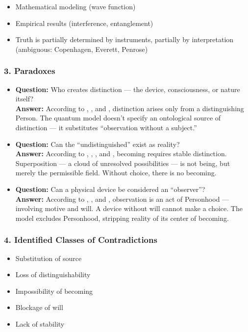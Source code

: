 \documentclass[12pt]{article}
\begin{document}
\begin{itemize}
\item Mathematical modeling (wave function)
\item Empirical results (interference, entanglement)
\item Truth is partially determined by instruments, partially by interpretation (ambiguous: Copenhagen, Everett, Penrose)
\end{itemize}

\subsubsection*{3. Paradoxes}

\begin{itemize}
\item \textbf{Question:} Who creates distinction — the device, consciousness, or nature itself?  
\\ \textbf{Answer:} According to \text{[9.1]}, \text{[11.1.1]}, and \text{[12]}, distinction arises only from a distinguishing Person. The quantum model doesn’t specify an ontological source of distinction — it substitutes ``observation without a subject.''

\item \textbf{Question:} Can the ``undistinguished'' exist as reality?  
\\ \textbf{Answer:} According to \text{[3]}, \text{[5]}, \text{[7]}, and \text{[4.4]}, becoming requires stable distinction. Superposition — a cloud of unresolved possibilities — is not being, but merely the permissible field. Without choice, there is no becoming.

\item \textbf{Question:} Can a physical device be considered an ``observer''?  
\\ \textbf{Answer:} According to \text{[10.5]}, \text{[10.6]}, and \text{[12.3]}, observation is an act of Personhood — involving motive and will. A device without will cannot make a choice. The model excludes Personhood, stripping reality of its center of becoming.
\end{itemize}

\subsubsection*{4. Identified Classes of Contradictions}

\begin{itemize}
\item Substitution of source
\item Loss of distinguishability
\item Impossibility of becoming
\item Blockage of will
\item Lack of stability
\end{itemize}
\end{document}

